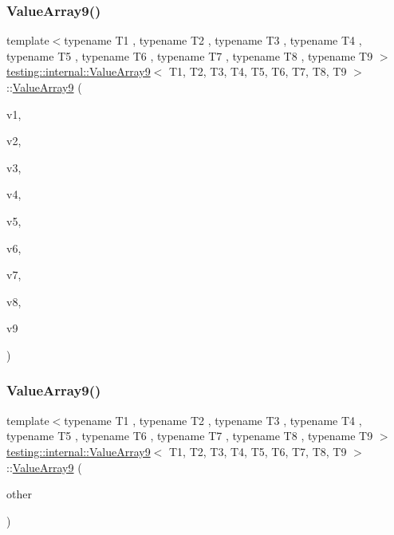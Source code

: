 \subsubsection{\texorpdfstring{ValueArray9()}{ValueArray9()}\hspace{0.1cm}{\footnotesize\ttfamily [1/2]}}
{\footnotesize\ttfamily template$<$typename T1 , typename T2 , typename T3 , typename T4 , typename T5 , typename T6 , typename T7 , typename T8 , typename T9 $>$ \\
\mbox{\hyperlink{classtesting_1_1internal_1_1ValueArray9}{testing\+::internal\+::\+Value\+Array9}}$<$ T1, T2, T3, T4, T5, T6, T7, T8, T9 $>$\+::\mbox{\hyperlink{classtesting_1_1internal_1_1ValueArray9}{Value\+Array9}} (\begin{DoxyParamCaption}\item[{T1}]{v1,  }\item[{T2}]{v2,  }\item[{T3}]{v3,  }\item[{T4}]{v4,  }\item[{T5}]{v5,  }\item[{T6}]{v6,  }\item[{T7}]{v7,  }\item[{T8}]{v8,  }\item[{T9}]{v9 }\end{DoxyParamCaption})\hspace{0.3cm}{\ttfamily [inline]}}

\mbox{\label{classtesting_1_1internal_1_1ValueArray9_ab251d9c7a0df5c8034ecda38eadd030a}} 
\subsubsection{\texorpdfstring{ValueArray9()}{ValueArray9()}\hspace{0.1cm}{\footnotesize\ttfamily [2/2]}}
{\footnotesize\ttfamily template$<$typename T1 , typename T2 , typename T3 , typename T4 , typename T5 , typename T6 , typename T7 , typename T8 , typename T9 $>$ \\
\mbox{\hyperlink{classtesting_1_1internal_1_1ValueArray9}{testing\+::internal\+::\+Value\+Array9}}$<$ T1, T2, T3, T4, T5, T6, T7, T8, T9 $>$\+::\mbox{\hyperlink{classtesting_1_1internal_1_1ValueArray9}{Value\+Array9}} (\begin{DoxyParamCaption}\item[{const \mbox{\hyperlink{classtesting_1_1internal_1_1ValueArray9}{Value\+Array9}}$<$ T1, T2, T3, T4, T5, T6, T7, T8, T9 $>$ \&}]{other }\end{DoxyParamCaption})\hspace{0.3cm}{\ttfamily [inline]}}




